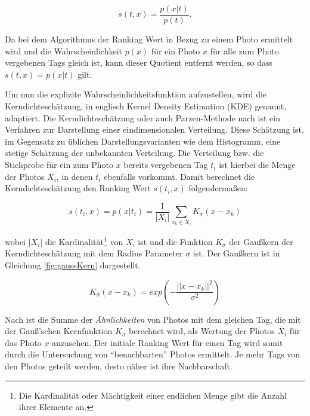 \begin{figure}[hptb]
  \begin{equation}
  \label{fig:bayesInitialRelevance}
    s(t, x) = \frac{p(x \vert t)}{ p(t) }.
  \end{equation}
\end{figure} 

Da bei dem Algorithmus der Ranking Wert in Bezug zu einem Photo ermittelt wird und die Wahrscheinlichkeit $p(x)$ für ein Photo $x$ für alle zum Photo vergebenen Tags gleich ist, kann dieser Quotient entfernt werden, so dass $s(t,x) = p(x \vert t)$ gilt.

Um nun die explizite Wahrscheinlichkeitsfunktion aufzustellen, wird die Kerndichteschätzung, in englisch Kernel Density Estimation (KDE) genannt, adaptiert. Die Kerndichteschätzung oder auch Parzen-Methode nach \cite{parzen} ist ein Verfahren zur Darstellung einer eindimensionalen Verteilung. Diese Schätzung ist, im Gegensatz zu üblichen Darstellungsvarianten wie dem Histogramm, eine stetige Schätzung der unbekannten Verteilung. Die Verteilung bzw. die Stichprobe für ein zum Photo $x$ bereits vergebenen Tag $t_i$ ist hierbei die Menge der Photos $X_i$, in denen $t_i$ ebenfalls vorkommt. Damit berechnet die Kerndichteschätzung den Ranking Wert $s(t_i, x)$ folgendermaßen:

\begin{figure}[hptb]
  \begin{equation}
  \label{fig:kdeRelevance}
    s(t_i, x) = p(x \vert t_i) = \frac{1}{ \vert X_i \vert} \sum_{x_k \in X_i} K_{\sigma}(x - x_k)
  \end{equation}
\end{figure}

wobei $\vert X_i \vert$ die Kardinalität\footnote{Die Kardinalität oder Mächtigkeit einer endlichen Menge gibt die Anzahl ihrer Elemente an.} von $X_i$ ist und die Funktion $K_\sigma$ der Gaußkern der Kerndichteschätzung mit dem Radius Parameter $\sigma$ ist. Der Gaußkern ist in Gleichung \ref{fig:gaussKern} dargestellt.
\begin{figure}[hptb]
  \begin{equation}
  \label{fig:gaussKern}
    K_{\sigma}(x - x_k) = exp(-\frac{\vert \vert x - x_k \vert \vert^2}{ \sigma^2})
  \end{equation}
\end{figure}

Nach \cite{ranking} ist die Summe der \emph{Ähnlichkeiten} von Photos mit dem gleichen Tag, die mit der Gauß'schen Kernfunktion $K_\sigma$ berechnet wird, als Wertung der Photos $X_i$ für das Photo $x$ anzusehen. Der initiale Ranking Wert für einen Tag wird somit durch die Untersuchung von ``benachbarten'' Photos ermittelt. Je mehr Tags von den Photos geteilt werden, desto näher ist ihre Nachbarschaft.


